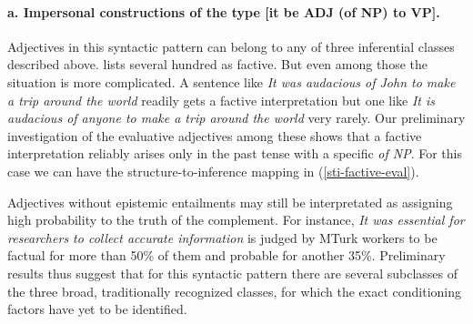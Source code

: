 \documentclass[10pt]{article}
\begin{document}
\vspace{-.2in}
\paragraph{a. Impersonal constructions of the type [it be ADJ (of NP) to VP].}
 Adjectives in this syntactic pattern can belong to any of three inferential classes described above. 
\cite{norrick:1978} lists several hundred as factive. But even among those 
the situation is more complicated. A sentence like \textit{It was audacious of John to make a trip around the world} readily gets a factive interpretation but one like \textit{It is audacious of anyone to make a trip around the world} very rarely. Our preliminary investigation of the evaluative adjectives among these shows that a factive interpretation reliably arises only in the past tense with a specific \textit{of NP}. For this case we can have the structure-to-inference mapping in (\ref{sti-factive-eval}).

\vspace{-0.5em}
\vspace{-0.5em}


Adjectives without epistemic entailments may still be interpretated as assigning high probability to the truth of the complement. For instance, \textit{It was essential for researchers to collect accurate information} is judged by MTurk workers to be factual for more than 50\% of them and probable for another 35\%. 
Preliminary results thus suggest that for this syntactic pattern there are several subclasses of the three broad, traditionally recognized classes, for which the exact conditioning factors have yet to be identified.

\vspace{-.2in}
\end{document}
